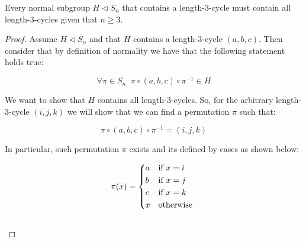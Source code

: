 \newpage

\begin{lemma}
    \label{lem:everyThreeCycleIsInSubgroupsOfAN}
    Every normal subgroup $H \triangleleft S_n$ that contains a length-3-cycle must contain all 
    length-3-cycles given that $n \geq 3$.
\end{lemma}
\begin{proof}
    Assume $H \triangleleft S_n$ and that $H$ contains a length-3-cycle $(a,b,c)$. Then consider 
    that by definition of normality we have that the following statement holds true:

    $$ \forall \pi \in S_n\;\; \pi \circ (a,b,c) \circ \pi^{-1} \in H $$ \vspace{0.2em}

    We want to show that $H$ contains all length-3-cycles. So, for the arbitrary length-3-cycle
    $(i,j,k)$ we will show that we can find a permutation $\pi$ such that:

    $$ \pi \circ (a,b,c) \circ \pi^{-1} = (i,j,k) $$ \vspace{0.2em}

    In particular, such permutation $\pi$ exists and its defined by cases as shown below:

    \begin{equation*}
        \pi(x) = 
        \begin{cases*}
            a      & \text{if} \( x = i \)  \\
            b      & \text{if} \( x = j \)  \\
            c      & \text{if} \( x = k \)  \\
            x      & \text{otherwise}       \\
        \end{cases*}
    \end{equation*} \\
\end{proof}

